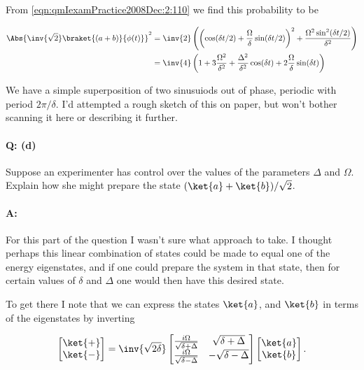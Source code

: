 From \ref{eqn:qmIexamPractice2008Dec:2:110} we find this probability to be

\begin{align*}
\Abs{
\inv{\sqrt{2}}
\braket{
 (a + b)}{\phi(t)}}^2
&=
\inv{2} \left(
\left(\cos(\delta t/2) + \frac{\Omega}{\delta} \sin(\delta t/2)\right)^2
+ \frac{ \Omega^2 \sin^2(\delta t/2)}{\delta^2}
\right) \\
&=
\inv{4} \left( 1 + 3 \frac{\Omega^2}{\delta^2} + \frac{\Delta^2}{\delta^2} \cos (\delta t) + 2 \frac{ \Omega}{\delta} \sin(\delta t) \right)
\end{align*}

We have a simple superposition of two sinusuiods out of phase, periodic with period $2 \pi/\delta$.  I'd attempted a rough sketch of this on paper, but won't bother scanning it here or describing it further.

\paragraph{Q: (d)}

Suppose an experimenter has control over the values of the parameters $\Delta$ and $\Omega$.  Explain how she might prepare the state $(\ket{a} + \ket{b})/\sqrt{2}$.

\paragraph{A:}

For this part of the question I wasn't sure what approach to take.  I thought perhaps this linear combination of states could be made to equal one of the energy eigenstates, and if one could prepare the system in that state, then for certain values of $\delta$ and $\Delta$ one would then have this desired state.

To get there I note that we can express the states $\ket{a}$, and $\ket{b}$ in terms of the eigenstates by inverting

\begin{equation}\label{eqn:qmIexamPractice2008Dec:2:150}
\begin{bmatrix}
\ket{+} \\
\ket{-} \\
\end{bmatrix}
=\inv{\sqrt{2\delta}}
\begin{bmatrix}
\frac{i \Omega}{\sqrt{\delta + \Delta}} & \sqrt{\delta + \Delta} \\
\frac{i \Omega}{\sqrt{\delta - \Delta}} & -\sqrt{\delta - \Delta}
\end{bmatrix}
\begin{bmatrix}
\ket{a} \\
\ket{b} \\
\end{bmatrix}.
\end{equation}

